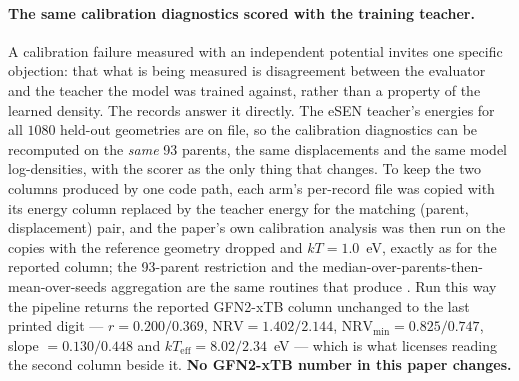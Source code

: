 \paragraph{The same calibration diagnostics scored with the training teacher.} A
calibration failure measured with an independent potential invites one specific
objection: that what is being measured is disagreement between the evaluator and the
teacher the model was trained against, rather than a property of the learned density.
The records answer it directly. The eSEN teacher's energies for all $1080$ held-out
geometries are on file, so the calibration diagnostics can be recomputed on the
\emph{same} 93 parents, the same displacements and the same model log-densities, with
the scorer as the only thing that changes. To keep the two columns produced by one code
path, each arm's per-record file was copied with its energy column replaced by the
teacher energy for the matching (parent, displacement) pair, and the paper's own
calibration analysis was then run on the copies with the reference geometry dropped and
$kT = 1.0$~eV, exactly as for the reported column; the 93-parent restriction and the
median-over-parents-then-mean-over-seeds aggregation are the same routines that produce
. Run this way the pipeline returns the reported GFN2-xTB column
unchanged to the last printed digit --- $r = 0.200 / 0.369$, $\mathrm{NRV} = 1.402 /
2.144$, $\mathrm{NRV}_{\min} = 0.825 / 0.747$, slope $= 0.130 / 0.448$ and
$kT_{\mathrm{eff}} = 8.02 / 2.34$~eV --- which is what licenses reading the second
column beside it. \textbf{No GFN2-xTB number in this paper changes.}


